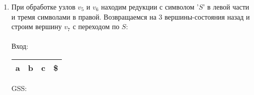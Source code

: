 \begin{example}
\begin{enumerate}
\begin{tikzpicture}[x=0.5pt,y=0.5pt,yscale=-1,xscale=1]
		
		\end{tikzpicture}
		\\
		
		\item При обработке узлов $v_5$ и $v_6$ находим редукции с символом '$S$' в левой части и тремя символами в правой. Возвращаемся на 3 вершины-состояния назад и строим вершину $v_7$ с переходом по $S$: \\ \\
		Вход: \,
		\begin{tabular}[c]{ |c|c|c|c| } 
			\hline a & b & c & \$ \\ \hline
		\end{tabular}
		\qquad GSS: \,
		\begin{tikzpicture}[x=0.5pt,y=0.5pt,yscale=-1,xscale=1]
		

\end{tikzpicture}
\end{enumerate}
\end{example}
